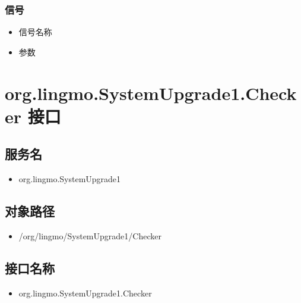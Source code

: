 \documentclass{utart}
\begin{document}
\subsubsection{信号}
\begin{itemize}
    \item 信号名称
    \item 参数
\end{itemize}

\section{org.lingmo.SystemUpgrade1.Checker 接口}
\subsection{服务名}
\begin{itemize}
    \item org.lingmo.SystemUpgrade1
\end{itemize}

\subsection{对象路径}
\begin{itemize}
    \item /org/lingmo/SystemUpgrade1/Checker
\end{itemize}

\subsection{接口名称}
\begin{itemize}
    \item org.lingmo.SystemUpgrade1.Checker
\end{itemize}
\end{document}
